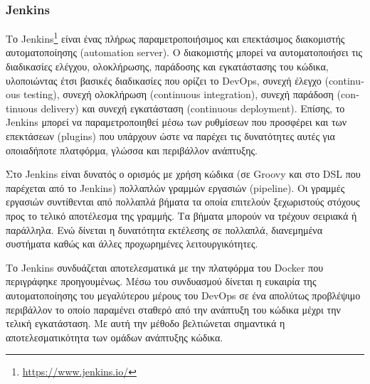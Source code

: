 \subsubsection{Jenkins} \label{subsection:4-2-1-3-jenkins}


Το Jenkins\footnote{\url{https://www.jenkins.io/}} είναι ένας πλήρως παραμετροποιήσιμος και επεκτάσιμος διακομιστής αυτοματοποίησης (\textenglish{automation server}). Ο διακομιστής μπορεί να αυτοματοποιήσει τις διαδικασίες ελέγχου, ολοκλήρωσης, παράδοσης και εγκατάστασης του κώδικα, υλοποιώντας έτσι βασικές διαδικασίες που ορίζει το DevOps, συνεχή έλεγχο (\textenglish{continuous testing}), συνεχή ολοκλήρωση (\textenglish{continuous integration}), συνεχή παράδοση (\textenglish{continuous delivery}) και συνεχή εγκατάσταση (\textenglish{continuous deployment}). Επίσης, το Jenkins μπορεί να παραμετροποιηθεί μέσω των ρυθμίσεων που προσφέρει και των επεκτάσεων (plugins) που υπάρχουν ώστε να παρέχει τις δυνατότητες αυτές για οποιαδήποτε πλατφόρμα, γλώσσα και περιβάλλον ανάπτυξης.

Στο Jenkins είναι δυνατός ο ορισμός με χρήση κώδικα (σε Groovy και στο DSL που παρέχεται από το Jenkins) πολλαπλών γραμμών εργασιών (pipeline). Οι γραμμές εργασιών συντίθενται από πολλαπλά βήματα τα οποία επιτελούν ξεχωριστούς στόχους προς το τελικό αποτέλεσμα της γραμμής. Τα βήματα μπορούν να τρέχουν σειριακά ή παράλληλα. Ενώ δίνεται η δυνατότητα εκτέλεσης σε πολλαπλά, διανεμημένα συστήματα καθώς και άλλες προχωρημένες λειτουργικότητες.

Το Jenkins συνδυάζεται αποτελεσματικά με την πλατφόρμα του Docker που περιγράφηκε προηγουμένως. Μέσω του συνδυασμού δίνεται η ευκαιρία της αυτοματοποίησης του μεγαλύτερου μέρους του DevOps σε ένα απολύτως προβλέψιμο περιβάλλον το οποίο παραμένει σταθερό από την ανάπτυξη του κώδικα μέχρι την τελική εγκατάσταση. Με αυτή την μέθοδο βελτιώνεται σημαντικά η αποτελεσματικότητα των ομάδων ανάπτυξης κώδικα.

